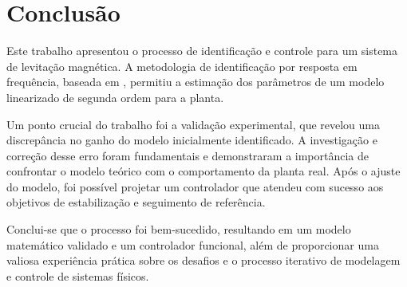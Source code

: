 \section{Conclusão}

Este trabalho apresentou o processo de identificação e controle para um sistema de levitação magnética. A metodologia de identificação por resposta em frequência, baseada em \cite{kawakami2003}, permitiu a estimação dos parâmetros de um modelo linearizado de segunda ordem para a planta.

Um ponto crucial do trabalho foi a validação experimental, que revelou uma discrepância no ganho do modelo inicialmente identificado. A investigação e correção desse erro foram fundamentais e demonstraram a importância de confrontar o modelo teórico com o comportamento da planta real. Após o ajuste do modelo, foi possível projetar um controlador que atendeu com sucesso aos objetivos de estabilização e seguimento de referência.

Conclui-se que o processo foi bem-sucedido, resultando em um modelo matemático validado e um controlador funcional, além de proporcionar uma valiosa experiência prática sobre os desafios e o processo iterativo de modelagem e controle de sistemas físicos.